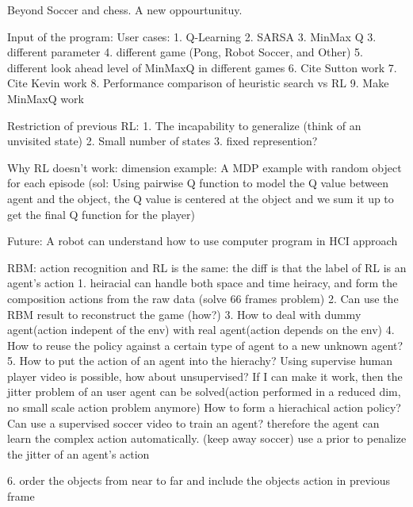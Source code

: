 Beyond Soccer and chess. A new oppourtunituy.

Input of the program:
User cases:
1. Q-Learning
2. SARSA
3. MinMax Q
3. different parameter
4. different game (Pong, Robot Soccer, and Other)
5. different look ahead level of MinMaxQ in different games
6. Cite Sutton work
7. Cite Kevin work
8. Performance comparison of heuristic search vs RL
9. Make MinMaxQ work

Restriction of previous RL:
1. The incapability to generalize (think of an unvisited state)
2. Small number of states
3. fixed represention?

Why RL doesn't work:
dimension
example:
A MDP example with random object for each episode
(sol: Using pairwise Q function to model the Q value between agent and the object, the Q value is centered at the object and we sum it up to get the final Q function for the player)

Future:
A robot can understand how to use computer program in HCI approach


RBM:
action recognition and RL is the same: the diff is that the label of RL is an agent's action
1. heiracial can handle both space and time heiracy, and form the composition actions from the raw data
(solve 66 frames problem)
2. Can use the RBM result to reconstruct the game (how?) 
3. How to deal with dummy agent(action indepent of the env) with real agent(action depends on the env)
4. How to reuse the policy against a certain type of agent to a new unknown agent?
5. How to put the action of an agent into the hierachy? Using supervise human player video is possible, how about unsupervised?
If I can make it work, then the jitter problem of an user agent can be solved(action performed in a reduced dim, no small scale action problem anymore)
How to form a hierachical action policy?
Can use a supervised soccer video to train an agent? therefore the agent can learn the complex action automatically. (keep away soccer)
use a prior to penalize the jitter of an agent's action



6. order the objects from near to far and include the objects action in previous frame



